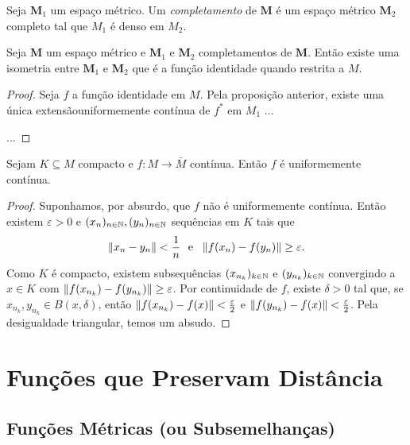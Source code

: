 \begin{defi}
Seja $\bm M_1$  um espaço métrico. Um \emph{completamento} de $\bm M$ é um espaço métrico $\bm M_2$ completo tal que $M_1$ é denso em $M_2$.
\end{defi}

\begin{prop}
Seja $\bm M$ um espaço métrico e $\bm M_1$ e $\bm M_2$ completamentos de $\bm M$. Então existe uma isometria entre $\bm M_1$ e $\bm M_2$ que é a função identidade quando restrita a $M$.
\end{prop}
\begin{proof}
	Seja $f$ a função identidade em $M$. Pela proposição anterior, existe uma única extensãouniformemente contínua de $f^*$ em $M_1$ ...
	
	...
\end{proof}


\begin{prop}
Sejam $K \subseteq M$ compacto e $f: M \to \bar M$ contínua. Então $f$ é uniformemente contínua.
\end{prop}
\begin{proof}
Suponhamos, por absurdo, que $f$ não é uniformemente contínua. Então existem $\varepsilon > 0$ e $(x_n)_{n \in \mathbb{N}},(y_n)_{n \in \mathbb{N}}$ sequências em $K$ tais que
	\begin{equation*}
	\left\Vert{x_n - y_n}\right\Vert < \frac{1}{n} \text{\ \ e\ \ } \left\Vert{f(x_n)-f(y_n)}\right\Vert \geq \varepsilon.
	\end{equation*}
Como $K$ é compacto, existem subsequências $(x_{n_k})_{k \in \mathbb{N}}$  e $(y_{n_k})_{k \in \mathbb{N}}$ convergindo a $x \in K$ com $\left\Vert{f(x_{n_k})-f(y_{n_k})}\right\Vert \geq \varepsilon$. Por continuidade de $f$, existe $\delta > 0$ tal que, se $x_{n_k},y_{n_k} \in B(x,\delta)$, então $\left\Vert{f(x_{n_k})-f(x)}\right\Vert < \frac{\varepsilon}{2}$ e $\left\Vert{f(y_{n_k})-f(x)}\right\Vert < \frac{\varepsilon}{2}$. Pela desigualdade triangular, temos um absudo.
\end{proof}

\section{Funções que Preservam Distância}

\subsection{Funções Métricas (ou Subsemelhanças)}

